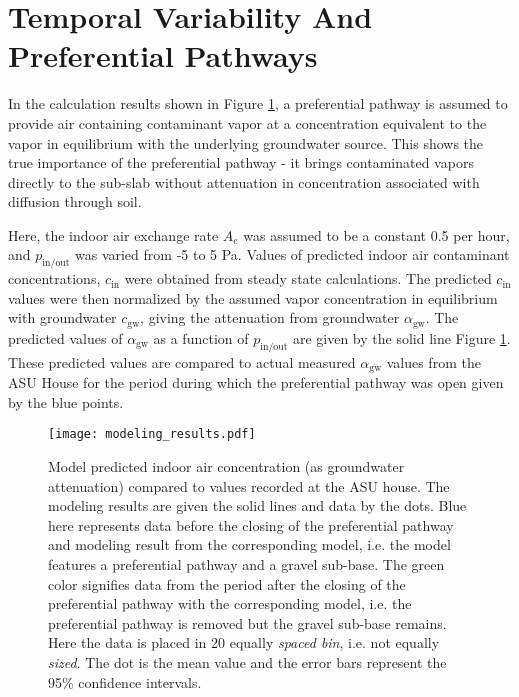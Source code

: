\section{Temporal Variability And Preferential Pathways}

In the calculation results shown in Figure \ref{fig:model_results}, a preferential pathway is assumed to provide air containing contaminant vapor at a concentration equivalent to the vapor in equilibrium with the underlying groundwater source.
This shows the true importance of the preferential pathway - it brings contaminated vapors directly to the sub-slab without attenuation in concentration associated with diffusion through soil.\par

Here, the indoor air exchange rate $A_e$ was assumed to be a constant 0.5 per hour, and $p_\mathrm{in/out}$ was varied from -5 to 5 Pa.
Values of predicted indoor air contaminant concentrations, $c_\mathrm{in}$ were obtained from steady state calculations.
The predicted $c_\mathrm{in}$ values were then normalized by the assumed vapor concentration in equilibrium with groundwater $c_\mathrm{gw}$, giving the attenuation from groundwater $\alpha_\mathrm{gw}$.
The predicted values of $\alpha_\mathrm{gw}$ as a function of $p_\mathrm{in/out}$ are given by the solid line Figure \ref{fig:model_results}.
These predicted values are compared to actual measured $\alpha_\mathrm{gw}$ values from the ASU House for the period during which the preferential pathway was open given by the blue points.\par

\begin{figure}[htb!]
  \centering
  \texttt{[image: modeling\_results.pdf]}
  \caption[Predicted indoor air concentration compared to the ASU house.]{Model predicted indoor air concentration (as groundwater attenuation) compared to values recorded at the ASU house. The modeling results are given the solid lines and data by the dots. Blue here represents data before the closing of the preferential pathway and modeling result from the corresponding model, i.e. the model features a preferential pathway and a gravel sub-base. The green color signifies data from the period after the closing of the preferential pathway with the corresponding model, i.e. the preferential pathway is removed but the gravel sub-base remains. Here the data is placed in 20 equally \textit{spaced bin}, i.e. not equally \textit{sized}. The dot is the mean value and the error bars represent the 95\% confidence intervals.}
  \label{fig:model_results}
\end{figure}


